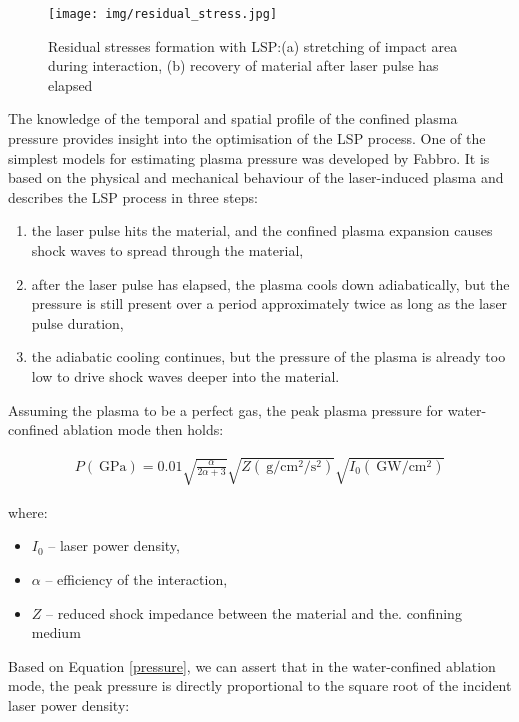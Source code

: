 \begin{figure}[h]
    \centering
    \texttt{[image: img/residual\_stress.jpg]}
    \caption{Residual stresses formation with LSP:(a) stretching of impact area during interaction, (b) recovery of material after laser pulse has elapsed \cite{fabbro_peyre_berthe_scherpereel_1998}}
    \label{fig:lspresidual}
\end{figure}


The knowledge of the temporal and spatial profile of the confined plasma pressure provides insight into the optimisation of the LSP process. One of the simplest models for estimating plasma pressure was developed by Fabbro. It is based on the physical and mechanical behaviour of the laser-induced plasma and describes the LSP process in three steps:

\begin{enumerate}
    \item the laser pulse hits the material, and the confined plasma expansion causes shock waves to spread through the material,
    \item after the laser pulse has elapsed, the plasma cools down adiabatically, but the pressure is still present over a period approximately twice as long as the laser pulse duration,
    \item the adiabatic cooling continues, but the pressure of the plasma is already too low to drive shock waves deeper into the material.
\end{enumerate}

Assuming the plasma to be a perfect gas, the peak plasma pressure for water-confined ablation mode then holds:

\begin{gather} \label{pressure}
P(\SI{}{\giga\pascal}) = 0.01\sqrt{\frac{\alpha}{2\alpha + 3}}\sqrt{Z (\SI{}{\gram\per\cm\squared\per\second\squared})}\sqrt{I_{0} (\SI{}{\giga\watt\per\cm\squared})}
\end{gather} 

where:

\begin{itemize}
    \item $I_{0}$ -- laser power density,
    \item $\alpha$ -- efficiency of the interaction,
    \item $Z$ -- reduced shock impedance between the material and the. confining medium
\end{itemize}
    
Based on Equation \ref{pressure}, we can assert that in the water-confined ablation mode, the peak pressure is directly proportional to the square root of the incident laser power density:

